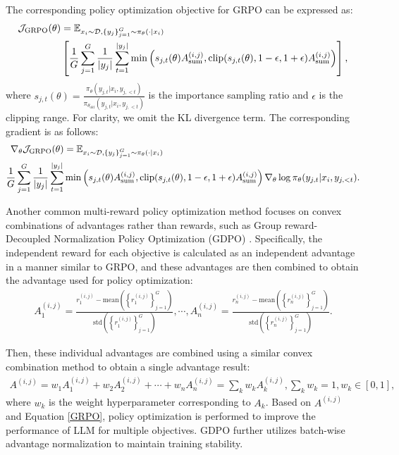 \documentclass{llmxive}
\begin{document}
The corresponding policy optimization objective for GRPO can be expressed as:
\begin{align}
    \mathcal{J}_\text{GRPO}(\theta) &= \mathbb{E}_{x_i \sim \mathcal{D},\left\{y_j\right\}_{j=1}^G \sim \pi_\theta(\cdot | x_i)} \notag \\ &\left[ \frac{1}{G} \sum_{j=1}^G \frac{1}{|y_j|} \sum_{t=1}^{|y_j|} \min \left( s_{j,t}(\theta) A_\text{sum}^{(i,j)}, \text{clip}(s_{j,t}(\theta), 1 - \epsilon, 1+\epsilon)A_\text{sum}^{(i,j)} \right) \right],\label{GRPO}
\end{align}
where $s_{j,t}(\theta) = \frac{\pi_\theta (y_{j,t} | x_i, y_{j, <t})}{\pi_{\theta_\text{old}} (y_{j,t} | x_i, y_{j, <t})}$ is the importance sampling ratio and $\epsilon$ is the clipping range. For clarity, we omit the KL divergence term. The corresponding gradient is as follows:
\begin{align}
    \nabla_\theta \mathcal{J}_\text{GRPO}(\theta) &= \mathbb{E}_{x_i \sim \mathcal{D},\left\{y_j\right\}_{j=1}^G \sim \pi_\theta(\cdot | x_i)} \notag \\ \frac{1}{G} \sum_{j=1}^G \frac{1}{|y_j|} \sum_{t=1}^{|y_j|} & \min \left( s_{j,t}(\theta) A_\text{sum}^{(i,j)}, \text{clip}(s_{j,t}(\theta), 1 - \epsilon, 1+\epsilon)A_\text{sum}^{(i,j)} \right) \nabla_\theta \log \pi_\theta (y_{j,t} | x_i, y_{j, <t}).\label{GRPO_gradient}
\end{align}

Another common multi-reward policy optimization method focuses on convex combinations of advantages rather than rewards, such as Group reward-Decoupled Normalization Policy Optimization (GDPO) \citep{gdpo}. Specifically, the independent reward for each objective is calculated as an independent advantage in a manner similar to GRPO, and these advantages are then combined to obtain the advantage used for policy optimization: 
\begin{align}
    A_1^{(i,j)} = \frac{r_1^{(i,j)} - \text{mean} \left(\left\{ r_1^{(i,j)} \right\}_{j=1}^G\right)}{\text{std} \left(\left\{ r_1^{(i,j)} \right\}_{j=1}^G\right)}, \cdots, A_n^{(i,j)} = \frac{r_n^{(i,j)} - \text{mean} \left(\left\{ r_n^{(i,j)} \right\}_{j=1}^G\right)}{\text{std} \left(\left\{ r_n^{(i,j)} \right\}_{j=1}^G\right)}.\label{advantage_combination}
\end{align}

Then, these individual advantages are combined using a similar convex combination method to obtain a single advantage result:
\begin{align}
    A^{(i,j)} = w_1A_1^{(i,j)} + w_2A_2^{(i,j)} + \cdots + w_nA_n^{(i,j)} = \sum_{k} w_k A_k^{(i,j)}, \sum_k w_k = 1, w_k \in [0, 1],\label{advantage_convex}
\end{align}
where $w_k$ is the weight hyperparameter corresponding to $A_k$. Based on $A^{(i,j)}$ and Equation \ref{GRPO}, policy optimization is performed to improve the performance of LLM for multiple objectives. GDPO further utilizes batch-wise advantage normalization to maintain training stability.
\end{document}
